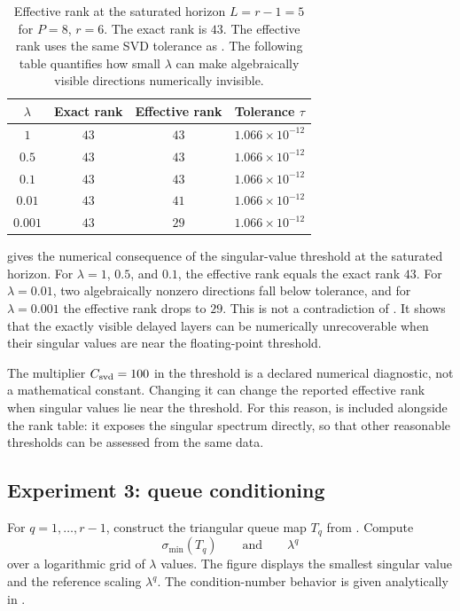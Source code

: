 \documentclass[preprint,12pt]{elsarticle}
\theoremstyle{plain}
\theoremstyle{remark}
\theoremstyle{definition}
\begin{document}
\begin{table}[htbp]
\centering
\caption{
Effective rank at the saturated horizon \(L=r-1=5\) for \(P=8\), \(r=6\).
The exact rank is \(43\).  The effective rank uses the same SVD tolerance as
.  The following table quantifies how small \(\lambda\) can
make algebraically visible directions numerically invisible.
}
\begin{tabular}{@{}cccc@{}}
\toprule
\(\lambda\) & Exact rank & Effective rank & Tolerance \(\tau\) \\
\midrule
\(1\)     & \(43\) & \(43\) & \(1.066\times10^{-12}\) \\
\(0.5\)   & \(43\) & \(43\) & \(1.066\times10^{-12}\) \\
\(0.1\)   & \(43\) & \(43\) & \(1.066\times10^{-12}\) \\
\(0.01\)  & \(43\) & \(41\) & \(1.066\times10^{-12}\) \\
\(0.001\) & \(43\) & \(29\) & \(1.066\times10^{-12}\) \\
\bottomrule
\end{tabular}
\label{tab:effective-rank-saturation}
\end{table}

 gives the numerical consequence of
the singular-value threshold at the saturated horizon.  For
\(\lambda=1\), \(0.5\), and \(0.1\), the effective rank equals the exact
rank \(43\).  For \(\lambda=0.01\), two algebraically nonzero directions
fall below tolerance, and for \(\lambda=0.001\) the effective rank drops to \(29\).  This is not a contradiction of .  It shows that the
exactly visible delayed layers can be numerically unrecoverable when their
singular values are near the floating-point threshold.

The multiplier \(C_{\rm svd}=100\) in the threshold is a declared numerical
diagnostic, not a mathematical constant.  Changing it can change the
reported effective rank when singular values lie near the threshold.  For
this reason,  is included alongside the
rank table: it exposes the singular spectrum directly, so that other
reasonable thresholds can be assessed from the same data.

\subsection{Experiment 3: queue conditioning}

For \(q=1,\ldots,r-1\), construct the triangular queue map \(T_q\) from
.  Compute
\[
  \sigma_{\min}(T_q)
  \qquad
  \text{and}
  \qquad
  \lambda^q
\]
over a logarithmic grid of \(\lambda\) values.  The figure displays the
smallest singular value and the reference scaling \(\lambda^q\).  The
condition-number behavior is given analytically in .
\end{document}
